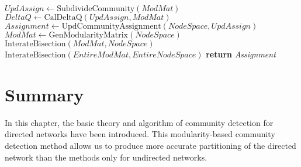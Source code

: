 \begin{algorithm}[H]
\begin{algorithmic}[1]
		\State $\textit{UpdAssign} \gets \text{SubdivideCommunity}(ModMat)$
		\State $\textit{DeltaQ} \gets \text{CalDeltaQ}(\textit{UpdAssign}, \textit{ModMat})$
		\State $\textit{Assignment} \gets \text{UpdCommunityAssignment}(\textit{NodeSpace}, \textit{UpdAssign})$
		\State $\textit{ModMat} \gets \text{GenModularityMatrix}(\textit{NodeSpace})$
		\State $\text{InterateBisection}(ModMat, NodeSpace)$
		\EndFor
		\EndIf 
		\EndProcedure
		\State $\text{InterateBisection}(EntireModMat, EntireNodeSpace)$
		\State \textbf{return} \emph{Assignment}
		\EndProcedure
	\end{algorithmic}
\end{algorithm}

\section{Summary}
In this chapter, the basic theory and algorithm of community detection for directed networks have been introduced. This modularity-based community detection method allows us to produce more accurate partitioning of the directed network than the methods only for undirected networks.